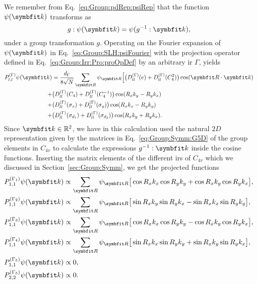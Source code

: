 We remember from Eq.~\eqref{eq:Group:pdRep:psiRep} that the function $\psi(\v{k})$ transforms as 
\begin{equation}
g:\psi(\v{k}) = \psi(g^{-1}:\v{k}),
\end{equation}
under a group
transformation $g$. Operating on the Fourier expansion of $\psi(\v{k})$ in Eq.~\eqref{eq:Group:SLH:psiFourier} with the projection operator
defined in Eq.~\eqref{eq:Group:Irr:Pro:proOpDef} by an arbitrary \ac{ir} $\Gamma$, yields
\begin{equation}
    \label{eq:Group:SLH:even:Ppsi}
    \begin{split}
        P_{l,l}^{(\Gamma)}\psi(\v{k}) &= \frac{d_\Gamma}{8\sqrt{N}}\sum_\v{R}\psi_\v{R}\Big[\big(D_{ll}^{(\Gamma)}(e)+D_{ll}^{(\Gamma)}(C_4^2)\big)\cos(\v{R}\cdot\v{k})\\
        + & \big(D_{ll}^{(\Gamma)}(C_4) + D_{ll}^{(\Gamma)}(C_4^{-1})\big)\cos(R_xk_y-R_yk_x)\\
        + & \big(D_{ll}^{(\Gamma)}(\sigma_x) + D_{ll}^{(\Gamma)}(\sigma_y)\big)\cos(R_xk_x-R_yk_y)\\
        + & \big(D_{ll}^{(\Gamma)}(\sigma_{d_1}) + D_{ll}^{(\Gamma)}(\sigma_{d_2})\big)\cos(R_xk_y+R_yk_x).
    \end{split}
\end{equation}
Since $\v{k}\in\mathbb{R}^2$, we have in this calculation used the natural $2D$ representation given by the matrices in Eq.~\eqref{eq:Group:Symm:G5D}
of the group elements in $C_{4v}$ to calculate the expressions $g^{-1}:\v{k}$ inside the cosine functions. Inserting the matrix elements of the different
\ac{ir}s of $C_{4v}$ which we discussed in Section~\ref{sec:Group:Symm}, we get the projected functions 
%
\begin{equation}
    \label{eq:Group:SLH:even:projections}
    \begin{split}
        P_{1,1}^{(\Gamma_1)}\psi(\v{k}) &\propto \sum_\v{R}\psi_\v{R}\big[\cos R_xk_x\cos R_yk_y + \cos R_xk_y\cos R_yk_x\big],\\
        P_{1,1}^{(\Gamma_2)}\psi(\v{k}) &\propto \sum_\v{R}\psi_\v{R}\big[\sin R_xk_y\sin R_yk_x - \sin R_xk_x\sin R_yk_y\big],\\
        P_{1,1}^{(\Gamma_3)}\psi(\v{k}) &\propto \sum_\v{R}\psi_\v{R}\big[\cos R_xk_x\cos R_yk_y - \cos R_xk_y\cos R_yk_x\big],\\
        P_{1,1}^{(\Gamma_4)}\psi(\v{k}) &\propto \sum_\v{R}\psi_\v{R}\big[\sin R_xk_x\sin R_yk_y + \sin R_xk_y\sin R_yk_x\big],\\
        P_{1,1}^{(\Gamma_5)}\psi(\v{k}) &\propto 0,\\
        P_{2,2}^{(\Gamma_5)}\psi(\v{k}) &\propto 0.
    \end{split}
\end{equation}
